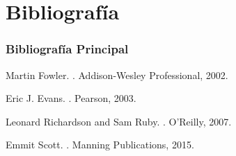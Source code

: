 \documentclass[a4paper,t,xcolor=pst,dvips,colortheme]{beamer}
\begin{document}
\section{Bibliografía}

\begin{frame}[c]
	\frametitle{Bibliografía Principal}
    \begin{thebibliography}{1}

Martin Fowler.
.
\newblock Addison-Wesley Professional, 2002.

Eric J. Evans.
.
\newblock Pearson, 2003.

Leonard Richardson and Sam Ruby.
.
\newblock  O'Reilly, 2007.

\bibitem{}
Emmit Scott.
.
\newblock  Manning Publications, 2015.

\end{thebibliography}
\end{frame}
\end{document}
